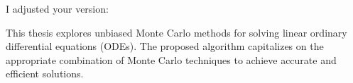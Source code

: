 I adjusted your version:

This thesis explores unbiased Monte Carlo methods for solving linear
ordinary differential equations (ODEs).
The proposed algorithm
capitalizes on the appropriate combination of Monte Carlo techniques
to achieve accurate and efficient solutions.
